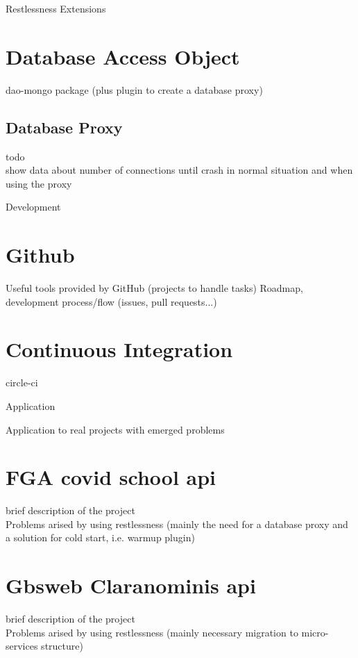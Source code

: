 \begin{mainmatter}
\begin{chapter}{Restlessness Extensions}
        \section{Database Access Object}
        dao-mongo package (plus plugin to create a database proxy)

        \subsection{Database Proxy}
        todo\\
        show data about number of connections until crash in normal
        situation and when using the proxy

    \end{chapter}


    \begin{chapter}{Development}
        \label{chap:development}

        \section{Github}
        Useful tools provided by GitHub (projects to handle tasks)
        Roadmap, development process/flow (issues, pull requests...)

        \section{Continuous Integration}
        circle-ci

    \end{chapter}


    \begin{chapter}{Application}
        \label{chap:application}

        Application to real projects with emerged problems

        \section{FGA covid school api}
        brief description of the project\\
        Problems arised by using restlessness (mainly the need for a database proxy
        and a solution for cold start, i.e. warmup plugin)


        \section{Gbsweb Claranominis api}
        brief description of the project\\
        Problems arised by using restlessness (mainly necessary migration to micro-services
        structure)


\end{chapter}
\end{mainmatter}
